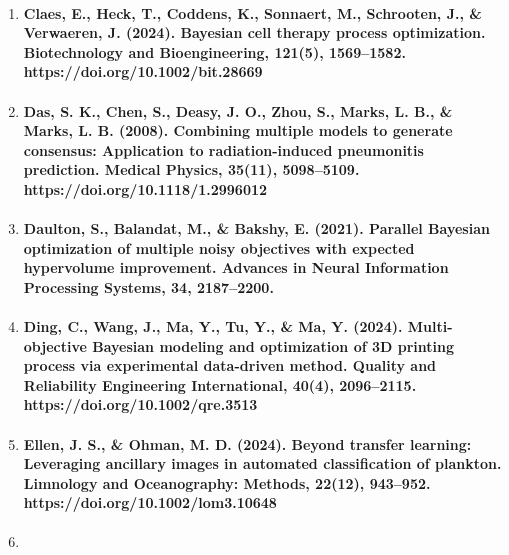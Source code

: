\begin{enumerate}
  \paragraph{Bischl, B., Binder, M., Lang, M., Pielok, T., Richter, J., Coors, S., Thomas, J., Ullmann, T., Becker, M., Boulesteix, A., Deng, D., \& Lindauer, M. (2023). Hyperparameter optimization: Foundations, algorithms, best practices, and open challenges. WIREs Data Mining and Knowledge Discovery, 13(2). https://doi.org/10.1002/widm.1484}
\item
  \paragraph{Claes, E., Heck, T., Coddens, K., Sonnaert, M., Schrooten, J., \& Verwaeren, J. (2024). Bayesian cell therapy process optimization. Biotechnology and Bioengineering, 121(5), 1569–1582. https://doi.org/10.1002/bit.28669}
\item
  \paragraph{Das, S. K., Chen, S., Deasy, J. O., Zhou, S., Marks, L. B., \& Marks, L. B. (2008). Combining multiple models to generate consensus: Application to radiation-induced pneumonitis prediction. Medical Physics, 35(11), 5098–5109. https://doi.org/10.1118/1.2996012}
\item
  \paragraph{Daulton, S., Balandat, M., \& Bakshy, E. (2021). Parallel Bayesian optimization of multiple noisy objectives with expected hypervolume improvement. Advances in Neural Information Processing Systems, 34, 2187–2200.}
\item
  \paragraph{Ding, C., Wang, J., Ma, Y., Tu, Y., \& Ma, Y. (2024). Multi-objective Bayesian modeling and optimization of 3D printing process via experimental data-driven method. Quality and Reliability Engineering International, 40(4), 2096–2115. https://doi.org/10.1002/qre.3513}
\item
  \paragraph{Ellen, J. S., \& Ohman, M. D. (2024). Beyond transfer learning: Leveraging ancillary images in automated classification of plankton. Limnology and Oceanography: Methods, 22(12), 943–952. https://doi.org/10.1002/lom3.10648}
\item

\end{enumerate}
